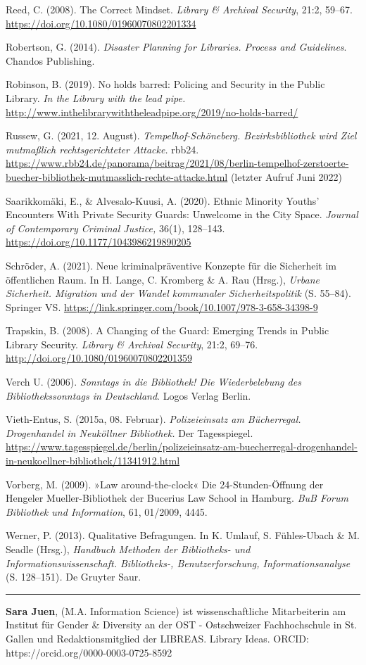 \documentclass[a4paper,
fontsize=11pt,
oneside,
numbers=noperiodatend,
parskip=half-,
bibliography=totoc,
final
]{scrartcl}
\begin{document}
Reed, C. (2008). The Correct Mindset. \emph{Library \& Archival
Security}, 21:2, 59--67. \url{https://doi.org/10.1080/01960070802201334}

Robertson, G. (2014). \emph{Disaster Planning for Libraries. Process and
Guidelines}. Chandos Publishing.

Robinson, B. (2019). No holds barred: Policing and Security in the
Public Library. \emph{In the Library with the lead pipe.}
\url{http://www.inthelibrarywiththeleadpipe.org/2019/no-holds-barred/}

Russew, G. (2021, 12. August). \emph{Tempelhof-Schöneberg.
Bezirksbibliothek wird Ziel mutmaßlich rechtsgerichteter Attacke.}
rbb24.
\url{https://www.rbb24.de/panorama/beitrag/2021/08/berlin-tempelhof-zerstoerte-buecher-bibliothek-mutmasslich-rechte-attacke.html}
(letzter Aufruf Juni 2022)

Saarikkomäki, E., \& Alvesalo-Kuusi, A. (2020). Ethnic Minority Youths'
Encounters With Private Security Guards: Unwelcome in the City Space.
\emph{Journal of Contemporary Criminal Justice,} 36(1), 128--143.
\url{https://doi.org/10.1177/1043986219890205}

Schröder, A. (2021). Neue kriminalpräventive Konzepte für die Sicherheit
im öffentlichen Raum. In H. Lange, C. Kromberg \& A. Rau (Hrsg.),
\emph{Urbane Sicherheit. Migration und der Wandel kommunaler
Sicherheitspolitik} (S. 55--84). Springer VS.
\url{https://link.springer.com/book/10.1007/978-3-658-34398-9}

Trapskin, B. (2008). A Changing of the Guard: Emerging Trends in Public
Library Security. \emph{Library \& Archival Security}, 21:2, 69--76.
\url{http://doi.org/10.1080/01960070802201359}

Verch U. (2006). \emph{Sonntags in die Bibliothek! Die Wiederbelebung
des Bibliothekssonntags in Deutschland}. Logos Verlag Berlin.

Vieth-Entus, S. (2015a, 08. Februar). \emph{Polizeieinsatz am
Bücherregal. Drogenhandel in Neuköllner Bibliothek.} Der Tagesspiegel.
\url{https://www.tagesspiegel.de/berlin/polizeieinsatz-am-buecherregal-drogenhandel-in-neukoellner-bibliothek/11341912.html}

Vorberg, M. (2009). »Law around-the-clock« Die 24-Stunden-Öffnung der
Hengeler Mueller-Bibliothek der Bucerius Law School in Hamburg.
\emph{BuB Forum Bibliothek und Information}, 61, 01/2009, 4445.

Werner, P. (2013). Qualitative Befragungen. In K. Umlauf, S.
Fühles-Ubach \& M. Seadle (Hrsg.), \emph{Handbuch Methoden der
Bibliotheks- und Informationswissenschaft. Bibliotheks-,
Benutzerforschung, Informationsanalyse} (S. 128--151)\emph{.} De Gruyter
Saur.

\begin{center}\rule{0.5\linewidth}{0.5pt}\end{center}

\textbf{Sara Juen}, (M.A. Information Science) ist wissenschaftliche
Mitarbeiterin am Institut für Gender \& Diversity an der OST -
Ostschweizer Fachhochschule in St. Gallen und Redaktionsmitglied der
LIBREAS. Library Ideas. ORCID: https://orcid.org/0000-0003-0725-8592
\end{document}
